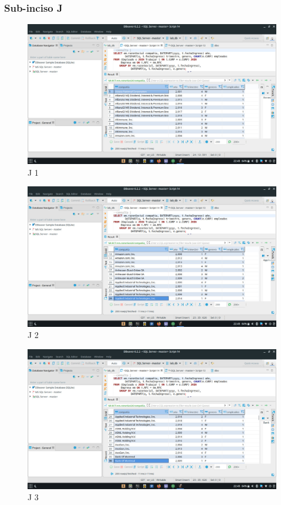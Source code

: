 \documentclass[a4paper, 12pt]{report}
\begin{document}
\subsubsection*{Sub-inciso J}
    \begin{figure}
        \includegraphics[width=\textwidth]
            {img/j1.jpeg}\hfill
    \caption{J 1}
    \end{figure}
    \begin{figure}
        \includegraphics[width=\textwidth]
            {img/j2.jpeg}\hfill
    \caption{J 2}
    \end{figure}
    \begin{figure}
        \includegraphics[width=\textwidth]
            {img/j3.jpeg}\hfill
    \caption{J 3}
    \end{figure}
\end{document}
